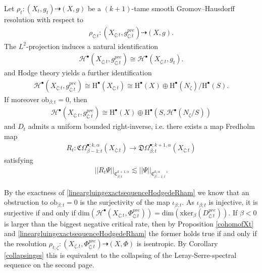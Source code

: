 \documentclass[psamsfonts]{amsart}
\theoremstyle{plain}
\theoremstyle{definition}{
\newtheorem{defi}{Definition}[section]
\newtheorem{ass}{Assumption}
\newtheorem*{nota}{Notation}}
\theoremstyle{remark}{
\newtheorem{rem}{Remark}
\newtheorem{ex}{Example}}
\theoremstyle{plain}{
\newtheorem{thm}{Theorem}[section]
\newtheorem{lem}{Lemma}[section]
\newtheorem{cor}{Corollary}[section]
\newtheorem{prop}{Proposition}[section]
\newtheorem{con}{Conjecture}[section]}
\newcommand{\m}[1]{{\mathrm{#1}}}
\begin{document}
\begin{prop}\cite[Prop. 9.4]{majewskiDirac}
\label{tameuniformboundedness}
Let $\rho_t\colon(X_t,g_t)\dashrightarrow (X,g)$ be a $(k+1)$-tame smooth Gromov--Hausdorff resolution with respect to 
\begin{align*}
    \rho_{\zeta;t}\colon(X_{\zeta;t},g^{pre}_{\zeta;t})\dashrightarrow (X,g).
\end{align*}
The $L^2$-projection induces a natural identification
\begin{align*}
    \mathcal{H}^\bullet(X_{\zeta;t},g^{pre}_{\zeta;t})\cong\mathcal{H}^\bullet(X_{\zeta;t},g_t).
\end{align*}
and Hodge theory yields a further identification 
\begin{align*}
    \mathcal{H}^\bullet(X_{\zeta;t},g^{pre}_{\zeta;t})\cong\m{H}^\bullet(X_{\zeta;t})\cong \m{H}^\bullet(X)\oplus \m{H}^\bullet(N_\zeta)/\m{H}^\bullet(S).
\end{align*}
If moreover $\m{ob}_{\beta;t}=0$, then 
\begin{align*}
    \mathcal{H}^\bullet(X_{\zeta;t},g^{pre}_{\zeta;t})\cong \m{H}^\bullet(X)\oplus \m{H}^\bullet(S,\mathcal{H}^\bullet(N_\zeta/S))
\end{align*}
and $D_{t}$ admits a uniform bounded right-inverse, i.e. there exists a map Fredholm map
\begin{align}
    R_{t} \colon\mathfrak{C}\Omega^{\bullet;k,\alpha}_{\beta-1;t}(X_{\zeta;t})\rightarrow \mathfrak{D}\Omega^{\bullet;k+1,\alpha}_{\beta;t}(X_{\zeta;t})
\end{align}
satisfying 
\begin{align*}
    \left|\left|R_{t}\Psi\right|\right|_{\mathfrak{C}^{k+1,\alpha}_{\beta;t}}\lesssim \left|\left|\Psi\right|\right|_{\mathfrak{C}^{k,\alpha}_{\beta-1;t}}.
\end{align*}
\end{prop}


\begin{rem}
By the exactness of \eqref{lineargluingexactsequenceHodgedeRham} we know that an obstruction to $\m{ob}_{\beta;t}=0$ is the surjectivity of the map $\iota_{\beta;t}$. As $\iota_{\beta;t}$ is injective, it is surjective if and only if $\m{dim}\left(\mathcal{H}^\bullet(X_{\zeta;t},\Phi^{pre}_{\zeta;t})\right)=\m{dim}(\m{xker}_\beta(D^{pre}_{\zeta;t}))$. If $\beta<0$ is larger than the biggest negative critical rate, then by Proposition \ref{cohomofXt} and \eqref{lineargluingexactsequenceHodgedeRham} the former holds true if and only if the resolution $\rho_{t;\zeta}\colon (X_{\zeta,t},\Phi^{pre}_{\zeta;t})\dashrightarrow (X,\Phi)$ is isentropic. By Corollary \ref{collapsingss} this is equivalent to the collapsing of the Leray-Serre-spectral sequence on the second page.
\end{rem}
\end{document}
